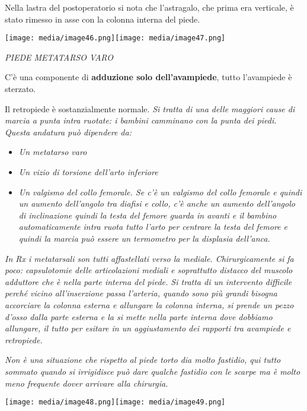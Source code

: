 \documentclass[]{article}
\begin{document}
Nella lastra del postoperatorio si nota che l'astragalo, che prima era
verticale, è stato rimesso in asse con la colonna interna del piede.

\texttt{[image: media/image46.png]}\texttt{[image: media/image47.png]}

\emph{PIEDE METATARSO VARO}

C'è una componente di \textbf{adduzione solo dell'avampiede}, tutto
l'avampiede è sterzato.

Il retropiede è sostanzialmente normale. \emph{Si tratta di una delle
maggiori cause di marcia a punta intra ruotate: i bambini camminano con
la punta dei piedi. Questa andatura può dipendere da:}

\begin{itemize}
\item
  \emph{Un metatarso varo}
\item
  \emph{Un vizio di torsione dell'arto inferiore }
\item
  \emph{Un valgismo del collo femorale. Se c'è un valgismo del collo
  femorale e quindi un aumento dell'angolo tra diafisi e collo, c'è
  anche un aumento dell'angolo di inclinazione quindi la testa del
  femore guarda in avanti e il bambino automaticamente intra ruota tutto
  l'arto per centrare la testa del femore e quindi la marcia può essere
  un termometro per la displasia dell'anca. }
\end{itemize}

\emph{In Rx i metatarsali son tutti affastellati verso la mediale.
Chirurgicamente si fa poco: capsulotomie delle articolazioni mediali e
soprattutto distacco del muscolo adduttore che è nella parte interna del
piede. Si tratta di un intervento difficile perché vicino all'inserzione
passa l'arteria, quando sono più grandi bisogna accorciare la colonna
esterna e allungare la colonna interna, si prende un pezzo d'osso dalla
parte esterna e la si mette nella parte interna dove dobbiamo allungare,
il tutto per esitare in un aggiustamento dei rapporti tra avampiede e
retropiede.}

\emph{Non è una situazione che rispetto al piede torto dia molto
fastidio, qui tutto sommato quando si irrigidisce può dare qualche
fastidio con le scarpe ma è molto meno frequente dover arrivare alla
chirurgia.}

\texttt{[image: media/image48.png]}\texttt{[image: media/image49.png]}
\end{document}
